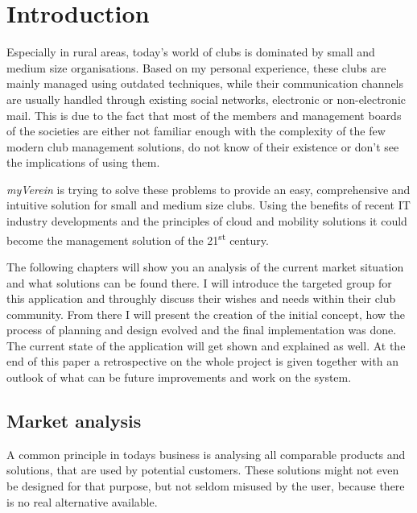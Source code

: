\pagestyle{fancy}
\lhead{}
\renewcommand{\headrulewidth}{0pt}
\setlength{\headheight}{14pt}

\chapter{Introduction}
\label{chapter:Intro}

Especially in rural areas, today's world of clubs is dominated by small and medium size organisations. Based on my personal experience, these clubs are mainly managed using outdated techniques, while their communication channels are usually handled through existing social networks, electronic or non-electronic mail. This is due to the fact that most of the members and management boards of the societies are either not familiar enough with the complexity of the few modern club management solutions, do not know of their existence or don't see the implications of using them.

\emph{myVerein} is trying to solve these problems to provide an easy, comprehensive and intuitive solution for small and medium size clubs. Using the benefits of recent IT industry developments and the principles of cloud and mobility solutions it could become the management solution of the 21\textsuperscript{st} century. 

The following chapters will show you an analysis of the current market situation and what solutions can be found there. I will introduce the targeted group for this application and throughly discuss their wishes and needs within their club community. From there I will present the creation of the initial concept, how the process of planning and design evolved and the final implementation was done. The current state of the application will get shown and explained as well. At the end of this paper a retrospective on the whole project is given together with an outlook of what can be future improvements and work on the system.

\section{Market analysis}
\label{sec:MarketAnalysis}

A common principle in todays business is analysing all comparable products and solutions, that are used by potential customers. These solutions might not even be designed for that purpose, but not seldom misused by the user, because there is no real alternative available.

